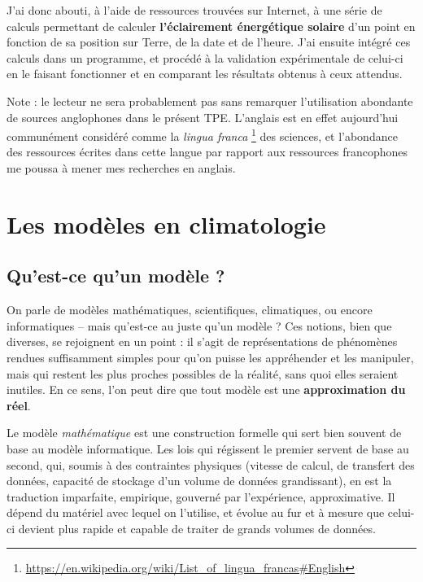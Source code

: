 \documentclass[12pt]{article}
\begin{document}
J'ai donc abouti, à l'aide de ressources trouvées sur Internet, à une série de calculs permettant de calculer \textbf{l'éclairement énergétique solaire} d'un point en fonction de sa position sur Terre, de la date et de l'heure.
J'ai ensuite intégré ces calculs dans un programme, et procédé à la validation expérimentale de celui-ci en le faisant fonctionner et en comparant les résultats obtenus à ceux attendus.

\vfill

\small{Note : le lecteur ne sera probablement pas sans remarquer l'utilisation abondante de sources anglophones dans le présent TPE.
L'anglais est en effet aujourd'hui communément considéré comme la \textit{lingua franca} \footnote{\url{https://en.wikipedia.org/wiki/List_of_lingua_francas\#English}} des sciences, et l'abondance des ressources écrites dans cette langue par rapport aux ressources francophones me poussa à mener mes recherches en anglais.}


\clearpage
\section{Les modèles en climatologie} %

\subsection{Qu'est-ce qu'un modèle ?}

On parle de modèles mathématiques, scientifiques, climatiques, ou encore informatiques -- mais qu'est-ce au juste qu'un modèle ?
Ces notions, bien que diverses, se rejoignent en un point : il s'agit de représentations de phénomènes rendues suffisamment simples pour qu'on puisse les appréhender et les manipuler, mais qui restent les plus proches possibles de la réalité, sans quoi elles seraient inutiles.
En ce sens, l'on peut dire que tout modèle est une \textbf{approximation du réel}.

Le modèle \emph{mathématique} est une construction formelle qui sert bien souvent de base au modèle informatique.
Les lois qui régissent le premier servent de base au second, qui, soumis à des contraintes physiques (vitesse de calcul, de transfert des données, capacité de stockage d'un volume de données grandissant), en est la traduction imparfaite, empirique, gouverné par l'expérience, approximative.
Il dépend du matériel avec lequel on l'utilise, et évolue au fur et à mesure que celui-ci devient plus rapide et capable de traiter de grands volumes de données.
\end{document}
